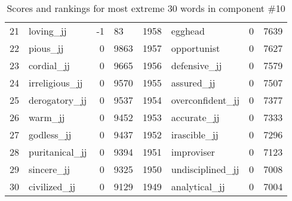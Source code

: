 \begin{table}[tbp]
\begin{tabular}{| rlr@{.}l | rlr@{.}l |}
    21 & loving\_jj & -1 & 83    &    1958 & egghead & 0 & 7639 \\
    22 & pious\_jj & 0 & 9863    &    1957 & opportunist & 0 & 7627 \\
    23 & cordial\_jj & 0 & 9665    &    1956 & defensive\_jj & 0 & 7579 \\
    24 & irreligious\_jj & 0 & 9570    &    1955 & assured\_jj & 0 & 7507 \\
    25 & derogatory\_jj & 0 & 9537    &    1954 & overconfident\_jj & 0 & 7377 \\
    26 & warm\_jj & 0 & 9452    &    1953 & accurate\_jj & 0 & 7333 \\
    27 & godless\_jj & 0 & 9437    &    1952 & irascible\_jj & 0 & 7296 \\
    28 & puritanical\_jj & 0 & 9394    &    1951 & improviser & 0 & 7123 \\
    29 & sincere\_jj & 0 & 9325    &    1950 & undisciplined\_jj & 0 & 7008 \\
    30 & civilized\_jj & 0 & 9129    &    1949 & analytical\_jj & 0 & 7004 \\
    \hline
    \end{tabular}
    \caption{Scores and rankings for most extreme 30 words in component \#10} 
\end{table}
\clearpage
